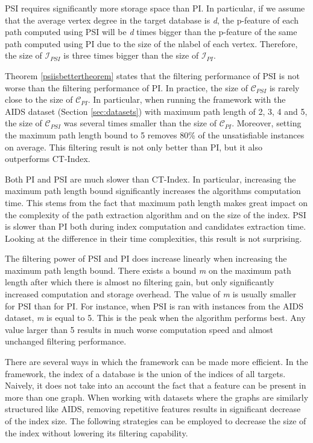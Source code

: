\documentclass{l4proj}
\newcommand{\fancyI}{\mathcal{I}}
\newcommand{\fancyC}{\mathcal{C}}
\begin{document}
PSI requires significantly more storage space than PI. In particular, if we assume that the average vertex degree in the target database is \emph{d}, the p-feature of each path computed using PSI will be \emph{d} times bigger than the p-feature of the same path computed using PI due to the size of the nlabel of each vertex. Therefore, the size of $\fancyI_{PSI}$ is three times bigger than the size of $\fancyI_{PI}$.

Theorem \ref{psiisbettertheorem} states that the filtering performance of PSI is not worse than the filtering performance of PI. In practice, the size of $\fancyC_{PSI}$ is rarely close to the size of $\fancyC_{PI}$. In particular, when running the framework with the AIDS dataset (Section \ref{sec:datasets}) with maximum path length of 2, 3, 4 and 5, the size of $\fancyC_{PSI}$ was several times smaller than the size of $\fancyC_{PI}$. Moreover, setting the maximum path length bound to 5 removes 80\% of the unsatisfiable instances on average. This filtering result is not only better than PI, but it also outperforms CT-Index.

Both PI and PSI are much slower than CT-Index. In particular, increasing the maximum path length bound significantly increases the algorithms computation time. This stems from the fact that maximum path length makes great impact on the complexity of the path extraction algorithm and on the size of the index. PSI is slower than PI both during index computation and candidates extraction time. Looking at the difference in their time complexities, this result is not surprising.

The filtering power of PSI and PI does increase linearly when increasing the maximum path length bound. There exists a bound \emph{m} on the maximum path length after which there is almost no filtering gain, but only significantly increased computation and storage overhead. The value of \emph{m} is usually smaller for PSI than for PI. For instance, when PSI is ran with instances from the AIDS dataset, \emph{m} is equal to 5. This is the peak when the algorithm performs best. Any value larger than 5 results in much worse computation speed and almost unchanged filtering performance.

There are several ways in which the framework can be made more efficient. In the framework, the index of a database is the union of the indices of all targets. Naively, it does not take into an account the fact that a feature can be present in more than one graph. When working with datasets where the graphs are similarly structured like AIDS, removing repetitive features results in significant decrease of the index size. The following strategies can be employed to decrease the size of the index without lowering its filtering capability.
\end{document}
